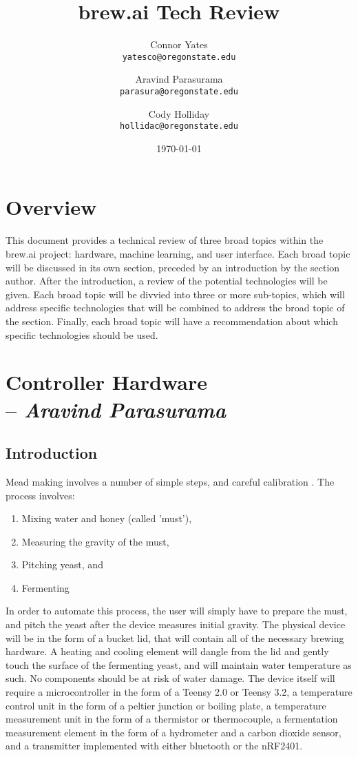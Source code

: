 \documentclass[draftclsnofoot,onecolumn,letterpaper,10pt]{IEEEtran}
\author{Connor Yates\\
\texttt{yatesco@oregonstate.edu\\}
\and
Aravind Parasurama\\
\texttt{parasura@oregonstate.edu\\}
\and
Cody Holliday\\
\texttt{hollidac@oregonstate.edu\\}}
\date{\today}
\title{brew.ai Tech Review}
\begin{document}
\maketitle

\newpage
\tableofcontents
\newpage
\section{Overview}
This document provides a technical review of three broad topics within the brew.ai project: hardware, machine learning, and user interface.
Each broad topic will be discussed in its own section, preceded by an introduction by the section author.
After the introduction, a review of the potential technologies will be given.
Each broad topic will be divvied into three or more sub-topics, which will address specific technologies that will be combined to address the broad topic of the section.
Finally, each broad topic will have a recommendation about which specific technologies should be used.

\section{Controller Hardware \\ -- \textbf{\textit{Aravind Parasurama}}}
\subsection{Introduction}
Mead making involves a number of simple steps, and careful calibration \cite{makingmead}. The process involves: 
\begin{enumerate}
	\item Mixing water and honey (called 'must'),
	\item Measuring the gravity of the must,
	\item Pitching yeast, and
	\item Fermenting
\end{enumerate}
In order to automate this process, the user will simply have to prepare the must, and pitch the yeast after the device measures initial gravity.
The physical device will be in the form of a bucket lid, that will contain all of the necessary brewing hardware. A heating and cooling element will
	dangle from the lid and gently touch the surface of the fermenting yeast, and will maintain water temperature as such. No components should be at
	risk of water damage.
The device itself will require a microcontroller in the form of a Teensy 2.0 or Teensy 3.2, a temperature control unit in the form of a peltier junction
	or boiling plate, a temperature measurement unit in the form of a thermistor or thermocouple, a fermentation measurement element in the form of a 
	hydrometer and a carbon dioxide sensor, and a transmitter implemented with either bluetooth or the nRF2401.
\end{document}
